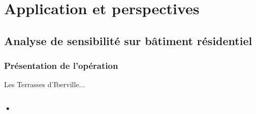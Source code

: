 \part{Application et perspectives}

\chapter{Analyse de sensibilité sur bâtiment résidentiel}

\section{Présentation de l'opération}

Les Terrasses d'Iberville...

\section{•}